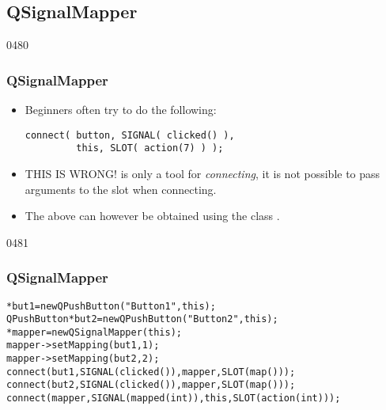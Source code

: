 \subsection{QSignalMapper}

\begin{slide}[fragile]{0480}\frametitle{QSignalMapper}
\label{qsignalmapper}
\begin{itemize}
  \item Beginners often try to do the following:
\begin{verbatim}
connect( button, SIGNAL( clicked() ), 
         this, SLOT( action(7) ) );
\end{verbatim}
  \item THIS IS WRONG!  is only a tool for
    \textit{connecting}, it is not possible to pass arguments to the slot
    when connecting.
  \item The above can however be obtained using the class
    .
  \end{itemize}
\end{slide}
\begin{slide}[fragile]{0481}\frametitle{QSignalMapper}
\small
\begin{alltt}
* but1 = new QPushButton("Button 1", this);
QPushButton* but2 = new QPushButton("Button 2", this);
* mapper = new QSignalMapper( this );
mapper->setMapping( but1, 1 );
mapper->setMapping( but2, 2 );
connect(but1, SIGNAL(clicked()), mapper, SLOT(map()));
connect(but2, SIGNAL(clicked()), mapper, SLOT(map()));
connect(mapper, SIGNAL(mapped(int)), this, SLOT(action(int)));
\end{alltt}
\end{slide}
